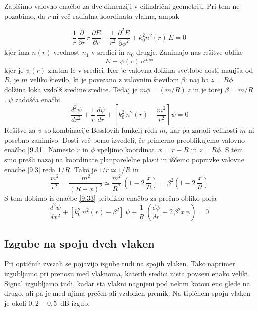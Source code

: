 Zapišimo valovno enačbo za dve dimenziji v cilindrični
geometriji. Pri tem ne pozabimo, da $r$ ni več radialna koordinata vlakna, ampak

\begin{equation}
\frac{1}{r}\,\frac{\partial}{\partial r}\, r\,\frac{\partial E}{\partial r}+\frac{1}{r^{2}}\,\frac{\partial^{2}E}{\partial\phi^{2}}+k_{0}^{2}n^{2}\left(r\right)\, E=0\label{9.31}
\end{equation}
 kjer ima $n\left(r\right)$ vrednost $n_{1}$ v sredici in $n_{0}$
drugje. Zanimajo nas rešitve oblike 
\begin{equation}
E=\psi\left(r\right)\, e^{im\phi}\label{9.32}
\end{equation}
 kjer je $\psi\left(r\right)$ znatna le v sredici. Ker je valovna
dolžina svetlobe dosti manjša od $R$, je $m$ veliko število, ki
je povezano z valovnim številom $\beta$: naj bo $z=R\phi$ dolžina
loka vzdolž sredine sredice. Tedaj je $m\phi=(m/R)\, z$ in je torej
$\beta=m/R$. $\psi$ zadošča enačbi 
\begin{equation}
\frac{d^{2}\psi}{dr^{2}}+\frac{1}{r}\,\frac{d\psi}{dr}+\left[k_{0}^{2}\, n^{2}\left(r\right)-\frac{m^{2}}{r^{2}}\right]\psi=0\label{9.33}
\end{equation}
 Rešitve za $\psi$ so kombinacije Besslovih funkcij reda $m$, kar
pa zaradi velikosti $m$ ni posebno zanimivo. Dosti več bomo izvedeli,
če primerno preoblikujemo valovno enačbo \ref{9.31}. Namesto $r$
in $\phi$ vpeljimo koordinati $x=r-R$ in $z=R\phi$. S tem smo prešli
nazaj na koordinate planparelelne plasti in iščemo popravke valovne
enacbe \ref{9.3} reda $1/R.$ Tako je $1/r\simeq1/R$ in 
\begin{equation}
\frac{m^{2}}{r^{2}}=\frac{m^{2}}{\left(R+x\right)^{2}}\simeq\frac{m^{2}}{R^{2}}\,\left(1-2\,\frac{x}{R}\right)=\beta^{2}\left(1-2\,\frac{x}{R}\right)\label{9.34}
\end{equation}
 S tem dobimo iz enačbe \ref{9.33} približno enačbo za prečno obliko
polja 
\begin{equation}
\frac{d^{2}\psi}{dx^{2}}+\left[k_{0}^{2}\, n^{2}\left(r\right)-\beta^{2}\right]\,\psi+\frac{1}{R}\,\left(\frac{d\psi}{dr}-2\,\beta^{2}x\,\psi\right)=0\label{9.35}
\end{equation}

\subsection*{Izgube na spoju dveh vlaken}
Pri optičnih zvezah se pojavijo izgube tudi na spojih vlaken.
Tako naprimer izgubljamo pri prenosu med vlaknoma, katerih sredici nista povsem
enako veliki. Signal izgubljamo tudi, kadar sta vlakni nagnjeni pod nekim kotom 
eno glede na drugo, ali pa je med njima prečen ali vzdolžen premik. Na tipičnem
spoju vlaken je okoli $0,2-0,5$~dB izgub. 

